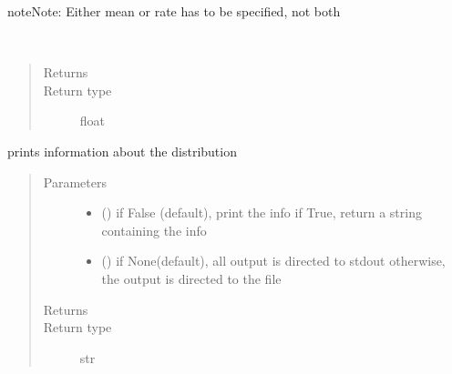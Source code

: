 \documentclass[letterpaper,10pt,english]{sphinxmanual}
\begin{document}
\begin{fulllineitems}
\begin{sphinxadmonition}{note}{Note:}
Either mean or rate has to be specified, not both
\end{sphinxadmonition}

\begin{fulllineitems}
\label{\detokenize{Reference:salabim.Exponential.mean}}~\begin{quote}\begin{description}
\item[{Returns}] \leavevmode
{}

\item[{Return type}] \leavevmode
float

\end{description}\end{quote}

\end{fulllineitems}


\begin{fulllineitems}
\label{\detokenize{Reference:salabim.Exponential.print_info}}
prints information about the distribution
\begin{quote}\begin{description}
\item[{Parameters}] \leavevmode\begin{itemize}
\item {} 
 () \textendash{} if False (default), print the info
if True, return a string containing the info

\item {} 
 () \textendash{} if None(default), all output is directed to stdout 
otherwise, the output is directed to the file

\end{itemize}

\item[{Returns}] \leavevmode
{}

\item[{Return type}] \leavevmode
str


\end{description}
\end{quote}
\end{fulllineitems}
\end{fulllineitems}
\end{document}
